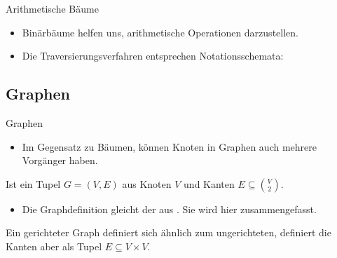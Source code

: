\begin{frame}{Arithmetische Bäume}
    \begin{itemize}[<+(1)->]
        \item Binärbäume helfen uns, arithmetische Operationen darzustellen.
    \end{itemize}
    \pause{}
    \begin{center}
    \end{center}
    \begin{itemize}[<+(1)->]
    \item Die Traversierungsverfahren entsprechen Notationsschemata: 
    \end{itemize}
\end{frame}

\subsection{Graphen}
\begin{frame}{Graphen}
    \begin{itemize}[<+(1)->]
        \item Im Gegensatz zu Bäumen, können Knoten in Graphen auch mehrere Vorgänger haben.
    \end{itemize}
    \pause{}
    \begin{definition}
        Ist ein Tupel \(G = (V,E)\) aus Knoten \(V\) und Kanten \(E \subseteq \binom{V}{2}\).
    \end{definition}
    \begin{itemize}[<+(1)->]
        \item Die Graphdefinition gleicht der aus . Sie wird hier zusammengefasst.
    \end{itemize}
    \pause{}
    \begin{definition}
        Ein gerichteter Graph definiert sich ähnlich zum ungerichteten, definiert die Kanten aber als Tupel \(E \subseteq V \times V\).
    \end{definition}
\end{frame}

